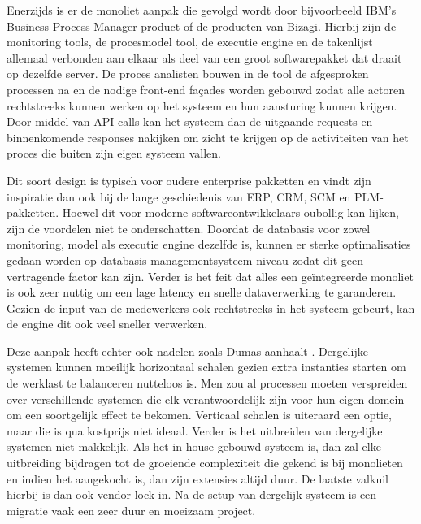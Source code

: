 Enerzijds is er de monoliet aanpak die gevolgd wordt door bijvoorbeeld IBM’s Business Process Manager product of de producten van Bizagi. Hierbij zijn de monitoring tools, de procesmodel tool, de executie engine en de takenlijst allemaal verbonden aan elkaar als deel van een groot softwarepakket dat draait op dezelfde server. De proces analisten bouwen in de tool de afgesproken processen na en de nodige front-end façades worden gebouwd zodat alle actoren rechtstreeks kunnen werken op het systeem en hun aansturing kunnen krijgen. Door middel van API-calls kan het systeem dan de uitgaande requests en binnenkomende responses nakijken om zicht te krijgen op de activiteiten van het proces die buiten zijn eigen systeem vallen. \newline

Dit soort design is typisch voor oudere enterprise pakketten en vindt zijn inspiratie dan ook bij de lange geschiedenis van ERP, CRM, SCM en PLM-pakketten. Hoewel dit voor moderne softwareontwikkelaars oubollig kan lijken, zijn de voordelen niet te onderschatten. Doordat de databasis voor zowel monitoring, model als executie engine dezelfde is, kunnen er sterke optimalisaties gedaan worden op databasis managementsysteem niveau zodat dit geen vertragende factor kan zijn. Verder is het feit dat alles een geïntegreerde monoliet is ook zeer nuttig om een lage latency en snelle dataverwerking te garanderen. Gezien de input van de medewerkers ook rechtstreeks in het systeem gebeurt, kan de engine dit ook veel sneller verwerken. \newline

Deze aanpak heeft echter ook nadelen zoals Dumas aanhaalt \autocite[p. 348]{Dumas2018}. Dergelijke systemen kunnen moeilijk horizontaal schalen gezien extra instanties starten om de werklast te balanceren nutteloos is. Men zou al processen moeten verspreiden over verschillende systemen die elk verantwoordelijk zijn voor hun eigen domein om een soortgelijk effect te bekomen. Verticaal schalen is uiteraard een optie, maar die is qua kostprijs niet ideaal. Verder is het uitbreiden van dergelijke systemen niet makkelijk. Als het in-house gebouwd systeem is, dan zal elke uitbreiding bijdragen tot de groeiende complexiteit die gekend is bij monolieten en indien het aangekocht is, dan zijn extensies altijd duur. De laatste valkuil hierbij is dan ook vendor lock-in. Na de setup van dergelijk systeem is een migratie vaak een zeer duur en moeizaam project. \newline

